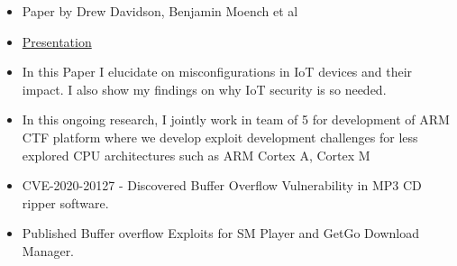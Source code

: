 \documentclass[10pt,a4paper,ragged2e]{altacv}
\begin{document}
\smallskip
\begin{itemize}
    \item Paper by Drew Davidson, Benjamin Moench et al
    \item \href{https://docs.google.com/presentation/d/1haWp3kqj5WqxxRPOOG0dyKisTX9GStP0hjPCJlNbUNM/edit?usp=sharing}{Presentation}
\end{itemize}

\begin{itemize}
    \item In this Paper I elucidate on misconfigurations in IoT devices and their impact. I also show my findings on why IoT security is so needed.  
\end{itemize}
\divider

\begin{itemize}
    \item In this ongoing research, I jointly work in team of 5 for development of ARM CTF platform where we develop exploit development challenges for less explored CPU architectures such as ARM Cortex A, Cortex M
\end{itemize}
\divider

\begin{itemize}
    \item CVE-2020-20127 - Discovered Buffer Overflow Vulnerability in MP3 CD ripper software.
    \item Published Buffer overflow Exploits for SM Player and GetGo Download Manager.
\end{itemize}

\smallskip
\divider

\smallskip


\nocite{*}
\end{document}
